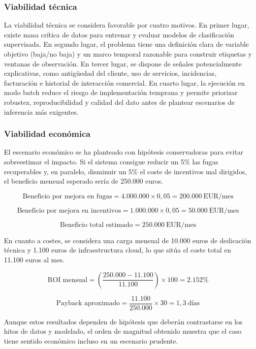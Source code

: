 ﻿\documentclass[12pt,a4paper]{article}
\begin{document}
\subsubsection{Viabilidad técnica}

La viabilidad técnica se considera favorable por cuatro motivos. En primer lugar, existe masa crítica de datos para entrenar y evaluar modelos de clasificación supervisada. En segundo lugar, el problema tiene una definición clara de variable objetivo (baja/no baja) y un marco temporal razonable para construir etiquetas y ventanas de observación. En tercer lugar, se dispone de señales potencialmente explicativas, como antigüedad del cliente, uso de servicios, incidencias, facturación e historial de interacción comercial. En cuarto lugar, la ejecución en modo batch reduce el riesgo de implementación temprana y permite priorizar robustez, reproducibilidad y calidad del dato antes de plantear escenarios de inferencia más exigentes.

\subsubsection{Viabilidad económica}

El escenario económico se ha planteado con hipótesis conservadoras para evitar sobreestimar el impacto. Si el sistema consigue reducir un 5\% las fugas recuperables y, en paralelo, disminuir un 5\% el coste de incentivos mal dirigidos, el beneficio mensual esperado sería de 250.000 euros.

\[
\text{Beneficio por mejora en fugas} = 4.000.000 \times 0{,}05 = 200.000\ \text{EUR/mes}
\]

\[
\text{Beneficio por mejora en incentivos} = 1.000.000 \times 0{,}05 = 50.000\ \text{EUR/mes}
\]

\[
\text{Beneficio total estimado} = 250.000\ \text{EUR/mes}
\]

En cuanto a costes, se considera una carga mensual de 10.000 euros de dedicación técnica y 1.100 euros de infraestructura cloud, lo que sitúa el coste total en 11.100 euros al mes.

\[
\text{ROI mensual} = \left(\frac{250.000 - 11.100}{11.100}\right)\times 100 = 2.152\%
\]

\[
\text{Payback aproximado} = \frac{11.100}{250.000}\times 30 = 1{,}3\ \text{días}
\]

Aunque estos resultados dependen de hipótesis que deberán contrastarse en los hitos de datos y modelado, el orden de magnitud obtenido muestra que el caso tiene sentido económico incluso en un escenario prudente.
\end{document}
